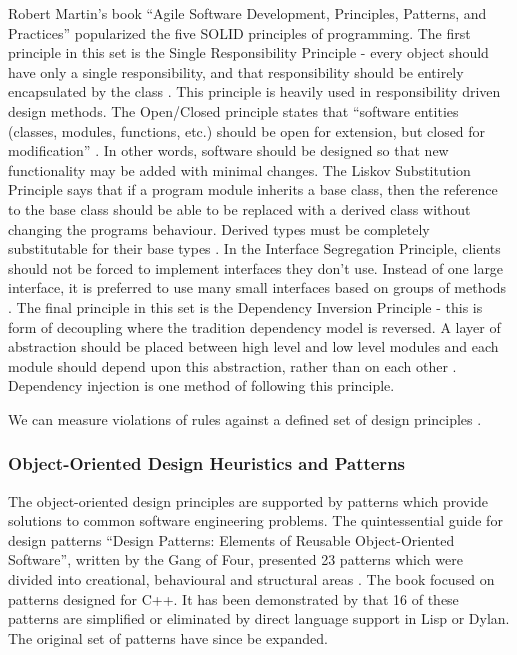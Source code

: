 Robert Martin's book ``Agile Software Development, Principles, Patterns, and Practices'' popularized the five SOLID principles of programming.  The first principle in this set is the Single Responsibility Principle - every object should have only a single responsibility, and that responsibility should be entirely encapsulated by the class \citep{martin02}. This principle is heavily used in responsibility driven design methods. The Open/Closed principle states that ``software entities (classes, modules, functions, etc.) should be open for extension, but closed for modification'' \citep{meyer88}. In other words, software should be designed so that new functionality may be added with minimal changes. The Liskov Substitution Principle says that if a program module inherits a base class, then the reference to the base class should be able to be replaced with a derived class without changing the programs behaviour. Derived types must be completely substitutable for their base types \citep{liskov87}. In the Interface Segregation Principle, clients should not be forced to implement interfaces they don't use. Instead of one large interface, it is preferred to use many small interfaces based on groups of methods \citep{martin96isp}. The final principle in this set is the Dependency Inversion Principle - this is form of decoupling where the tradition dependency model is reversed. A layer of abstraction should be placed between high level and low level modules and each module should depend upon this abstraction, rather than on each other \citep{martin96dip}. Dependency injection is one method of following this principle. 

We can measure violations of rules against a defined set of design principles \citep{marinescu04}.


\subsubsection{Object-Oriented Design Heuristics and Patterns}

The object-oriented design principles are supported by patterns which provide solutions to common software engineering problems. The quintessential guide for design patterns ``Design Patterns: Elements of Reusable Object-Oriented Software'', written by the Gang of Four, presented 23 patterns which were divided into creational, behavioural and structural areas \citep{gamma94}. The book focused on patterns designed for C++. It has been demonstrated by \citet{norvig} that 16 of these patterns are simplified or eliminated by direct language support in Lisp or Dylan. The original set of patterns have since be expanded. %

